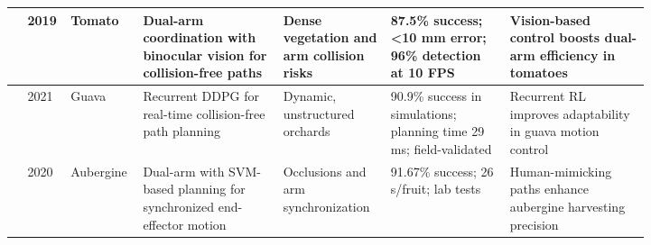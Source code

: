 \documentclass{ieeeaccess}
\begin{document}
\begin{table}[htbp]
\begin{tabular}{p{0.025\linewidth} p{0.025\linewidth} p{0.055\linewidth} p{0.2\linewidth} p{0.135\linewidth} p{0.175\linewidth} p{0.2\linewidth}}
\cite{ling2019dual} & 2019 & Tomato & Dual-arm coordination with binocular vision for collision-free paths & Dense vegetation and arm collision risks & 87.5\% success; <10 mm error; 96\% detection at 10 FPS & Vision-based control boosts dual-arm efficiency in tomatoes \\ \midrule
\cite{lin2021collision} & 2021 & Guava & Recurrent DDPG for real-time collision-free path planning & Dynamic, unstructured orchards & 90.9\% success in simulations; planning time 29 ms; field-validated & Recurrent RL improves adaptability in guava motion control \\ \midrule
\cite{sepulveda2020robotic} & 2020 & Aubergine & Dual-arm with SVM-based planning for synchronized end-effector motion & Occlusions and arm synchronization & 91.67\% success; 26 s/fruit; lab tests & Human-mimicking paths enhance aubergine harvesting precision \\ \midrule


\end{tabular}
\end{table}
\end{document}
